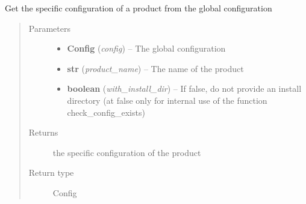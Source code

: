 \documentclass[a4paper,10pt,english]{sphinxmanual}
\begin{document}

\begin{fulllineitems}
\label{commands/apidoc/src:src.product.get_product_config}
Get the specific configuration of a product from the global configuration
\begin{quote}\begin{description}
\item[{Parameters}] \leavevmode\begin{itemize}
\item {} 
\textbf{Config} (\emph{config}) -- The global configuration

\item {} 
\textbf{str} (\emph{product\_name}) -- The name of the product

\item {} 
\textbf{boolean} (\emph{with\_install\_dir}) -- If false, do not provide an install 
directory (at false only for internal use 
of the function check\_config\_exists)

\end{itemize}

\item[{Returns}] \leavevmode
the specific configuration of the product

\item[{Return type}] \leavevmode
Config

\end{description}\end{quote}

\end{fulllineitems}

\end{document}
